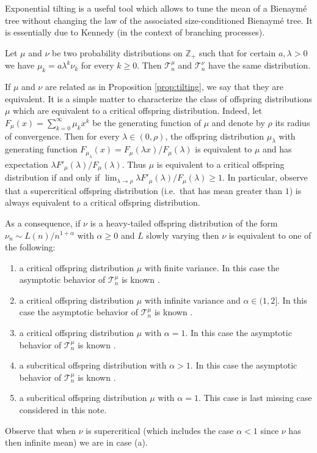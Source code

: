\documentclass[a4paper,11pt]{article}
\DeclareRobustCommand{\Z}{\mathbb{Z}}
\DeclareRobustCommand{\T}{\mathcal{T}}
\begin{document}
Exponential tilting is a useful tool which allows to tune the mean of a Bienaymé tree without changing the law of the associated size-conditioned Bienaymé tree. It is essentially due to Kennedy \cite{Ken75} (in the context of branching processes).

\begin{proposition}[Kennedy]
\label{prop:tilting}
Let $\mu$ and $\nu$ be two probability distributions on $\Z_{+}$ such that for certain $a,\lambda>0$ we have $\mu_k=a \lambda^{k} \nu_k$ for every $k \geq 0$. Then $\mathcal {T}^{\mu}_n$ and $\mathcal {T}^{\nu}_n$ have the same distribution.
\end{proposition}

If $\mu$ and $\nu$ are related as in Proposition \ref{prop:tilting}, we say that they are equivalent.  It is a simple matter to characterize the class of offspring distributions $\mu$ which are equivalent to a critical offspring distribution. Indeed, let $F_{\mu}(x)=\sum_{k=0}^{\infty} \mu_k x^{k}$ be the generating function of $\mu$ and denote by $\rho$ its radius of convergence. Then for every $\lambda \in (0,\rho)$, the offspring distribution $\mu_{\lambda}$ with generating function $F_{\mu_{\lambda}}(x)=F_{\mu}(\lambda x)/F_{\mu}(\lambda)$ is equivalent to $\mu$ and has expectation $\lambda F'_{\mu}(\lambda)/F_{\mu}(\lambda)$. Thus $\mu$ is equivalent to a critical offspring distribution if and only if $ \lim_{\lambda \rightarrow  \rho} \lambda F'_{\mu}(\lambda)/F_{\mu}(\lambda) \geq 1$. In particular, observe that a supercritical offspring distribution (i.e.~that has mean greater than $1$) is always equivalent to a critical offspring distribution. 

As a consequence, if $\nu$ is a heavy-tailed offspring distribution of the form $\nu_n \sim{L(n)}/{n^{1+\alpha}}$ with $\alpha \geq 0$ and $L$ slowly varying then $\nu$ is equivalent to one of the following:
\begin{enumerate}
\item[(a)] a critical offspring distribution $\mu$ with finite variance. In this case the asymptotic behavior of $\T^{\mu}_{n}$ is known \cite{Ald93}.
\item[(b)] a critical offspring distribution $\mu$ with infinite variance and $\alpha \in (1,2]$. In this case the asymptotic behavior of $\T^{\mu}_{n}$ is known \cite{Duq03}.
\item[(c)] a critical offspring distribution $\mu$ with $\alpha=1$. In this case the asymptotic behavior of $\T^{\mu}_{n}$ is known \cite{addarioberry2023criticaltreesshortfat}.
\item[(d)] a subcritical offspring distribution with $\alpha>1$. In this case the asymptotic behavior of $\T^{\mu}_{n}$ is known \cite{Kortchemski_2013}.
\item[(e)] a subcritical offspring distribution $\mu$ with $\alpha=1$. This case is last missing case considered in this note.
\end{enumerate}
Observe that when $\nu$ is supercritical (which includes the case $\alpha<1$ since $\nu$ has then infinite mean) we are in case (a).
\end{document}
